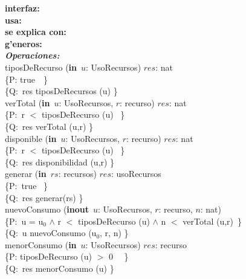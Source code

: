 \documentclass[a4paper,10pt]{article}
\begin{document}
\indent \noindent \textbf{interfaz:} \\
\indent \textbf{usa:}\\
\indent \textbf{se explica con:} \\
\indent \textbf{g'eneros:} \\



\noindent \textbf{\textsl{Operaciones:}}\\

\noindent tiposDeRecurso (\textbf{in}\ $u$: UsoRecursos)  \en $res$: nat \ \ \ \ \ \\
\indent \{P: true\ \ \}  \\
\indent \{Q:\ res \igobs tiposDeRecursos (u) \}\\

\noindent verTotal (\textbf{in}\ $u$: UsoRecursos, $r$: recurso)  \en $res$: nat \ \ \ \ \ \\
\indent \{P:\ r $<$ tiposDeRecurso (u) \ \}  \\
\indent \{Q:\ res \igobs verTotal (u,r) \}\\

\noindent disponible (\textbf{in}\ $u$: UsoRecursos, $r$: recurso)  \en $res$: nat \ \ \ \ \ \\
\indent \{P:\ r $<$ tiposDeRecurso (u) \ \}  \\
\indent \{Q:\ res \igobs disponibilidad (u,r) \}\\

\noindent generar (\textbf{in}\ $rs$: recursos)  \en $res$: usoRecursos \ \ \ \ \ \\
\indent \{P:\ true \ \}  \\
\indent \{Q:\ res \igobs generar(rs) \}\\

\noindent nuevoConsumo (\textbf{inout}\ $u$: UsoRecursos, $r$: recurso, $n$: nat) \ \ \ \ \ \\
\indent \{P:\ u = u$_0$ $\wedge$ r $<$ tiposDeRecurso (u) $\wedge$ n $<$ verTotal (u,r)\ \}  \\
\indent \{Q:\ u \igobs nuevoConsumo (u$_0$, r, n) \}\\

\noindent menorConsumo (\textbf{in}\ $u$: UsoRecursos)  \en $res$: recurso \ \ \ \ \ \\
\indent \{P: tiposDeRecurso (u) $>$ 0 \ \ \}  \\
\indent \{Q:\ res \igobs menorConsumo (u) \}\\
\end{document}
